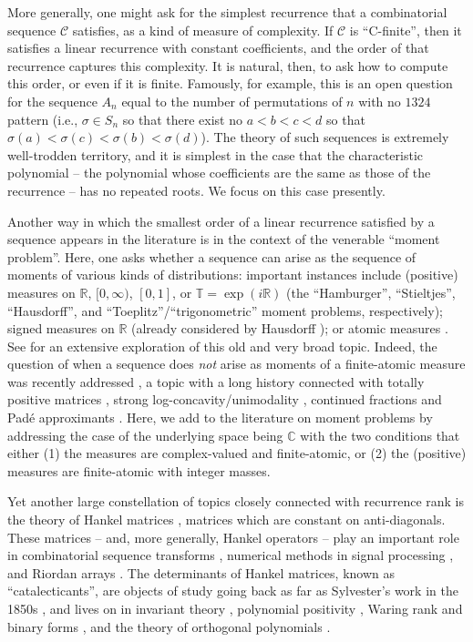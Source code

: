 \documentclass[12pt,reqno]{article}
\begin{document}
More generally, one might ask for the simplest recurrence that a combinatorial sequence $\mathcal{C}$ satisfies, as a kind of measure of complexity.  If $\mathcal{C}$ is ``C-finite'', then it satisfies a linear recurrence with constant coefficients, and the order of that recurrence captures this complexity.  It is natural, then, to ask how to compute this order, or even if it is finite.  Famously, for example, this is an open question for the sequence $A_n$ equal to the number of permutations of $n$ with no $1324$ pattern (i.e., $\sigma \in S_n$ so that there exist no $a<b<c<d$ so that $\sigma(a) < \sigma(c) < \sigma(b) < \sigma(d)$).  The theory of such sequences is extremely well-trodden territory, and it is simplest in the case that the characteristic polynomial -- the polynomial whose coefficients are the same as those of the recurrence -- has no repeated roots.  We focus on this case presently.

Another way in which the smallest order of a linear recurrence satisfied by a sequence appears in the literature is in the context of the venerable ``moment problem''.  Here, one asks whether a sequence can arise as the sequence of moments of various kinds of distributions: important instances include (positive) measures on $\mathbb{R}$, $[0,\infty)$, $[0,1]$, or $\mathbb{T} = \exp(i\mathbb{R})$ (the ``Hamburger'', ``Stieltjes'', ``Hausdorff'', and ``Toeplitz''/``trigonometric'' moment problems, respectively); signed measures on $\mathbb{R}$ (already considered by Hausdorff \cite{Ha23}); or atomic measures \cite{CurFiaMol2008,DioSch2017}.  See \cite{Sch2017} for an extensive exploration of this old and very broad topic.  Indeed, the question of when a sequence does {\em not} arise as moments of a finite-atomic measure was recently addressed \cite{BosElvGutMai2020}, a topic with a long history connected with totally positive matrices  \cite{FomZel2000,Pin2010}, strong log-concavity/unimodality \cite{Bre89,ChuLin15}, continued fractions and Pad\'{e} approximants \cite{ShoTam1943}.  Here, we add to the literature on moment problems by addressing the case of the underlying space being $\mathbb{C}$ with the two conditions that either (1) the measures are complex-valued and finite-atomic, or (2) the (positive) measures are finite-atomic with integer masses.

Yet another large constellation of topics closely connected with recurrence rank is the theory of Hankel matrices \cite{Lay2001,Wid1966}, matrices which are constant on anti-diagonals. These matrices -- and, more generally, Hankel operators -- play an important role in combinatorial sequence transforms \cite{Fre07,Lay2001}, numerical methods in signal processing \cite{ChuLin15}, and Riordan arrays \cite{PeaWoa00}.  The determinants of Hankel matrices, known as ``catalecticants'', are objects of study going back as far as Sylvester's work in the 1850s \cite{Syl1851}, and lives on in invariant theory \cite{Stu08}, polynomial positivity \cite{Ble13}, Waring rank and binary forms \cite{Rez2013}, and the theory of orthogonal polynomials \cite{Jun2003}.
\end{document}
